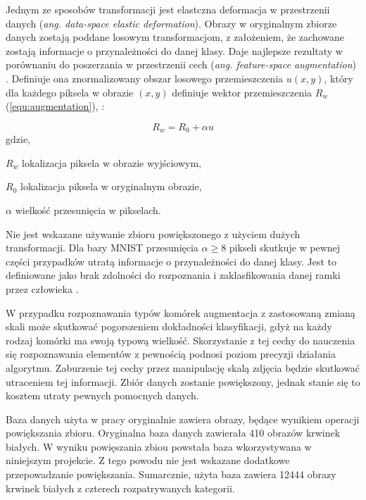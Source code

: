 {\parindent0pt %
Jednym ze sposobów transformacji jest elastczna deformacja w przestrzenii danych (\textit{ang. data-space elastic deformation}). Obrazy w oryginalnym zbiorze danych zostają poddane losowym transformacjom, z założeniem, że zachowane zostają informacje o przynależności do danej klasy. Daje najlepsze rezultaty w porównaniu do poszerzania w przestrzenii cech (\textit{ang. feature-space augmentation}) \cite{Wong2016UnderstandingDA}. Definiuje ona znormalizowany obszar losowego przemieszczenia \(u(x,y)\), który dla każdego piksela w obrazie \((x,y)\) definiuje wektor przemieszczenia \(R_w\) (\ref{equ:augmentation}), \cite{Wong2016UnderstandingDA}:

\begin{equation}
R_w = R_0 + \alpha u
\label{equ:augmentation}
\end{equation}
gdzie,
\begin{eqwhere}[2cm]
	\item[$R_w$] lokalizacja piksela w obrazie wyjściowym,
	\item[$R_0$] lokalizacja piksela w oryginalnym obrazie,
	\item[$\alpha$] wielkość przesunięcia w pikselach.
\end{eqwhere}

Nie jest wskazane używanie zbioru powiększonego z użyciem dużych transformacji. Dla bazy MNIST przesunięcia \( \alpha \geq 8 \)  pikseli skutkuje w pewnej części przypadków utratą informacje o przynależności do danej klasy. Jest to definiowane jako brak zdolności do rozpoznania i zaklasfikowania danej ramki przez człowieka \cite{Wong2016UnderstandingDA}.

W przypadku rozpoznawania typów komórek augmentacja z zastosowaną zmianą skali może skutkować pogorszeniem dokładności klasyfikacji, gdyż na każdy rodzaj komórki ma swoją typową wielkość. Skorzystanie z tej cechy do nauczenia się rozpoznawania elementów z pewnością podnosi poziom precyzji działania algorytmu. Zaburzenie tej cechy przez manipulację skalą zdjęcia będzie skutkować utraceniem tej informacji. Zbiór danych zostanie powiększony, jednak stanie się to kosztem utraty pewnych pomocnych danych.

Baza danych użyta w pracy oryginalnie zawiera obrazy, będące wynikiem operacji powiększania zbioru. Oryginalna baza danych zawierała 410 obrazów krwinek białych. W wyniku powięszania zbiou powstała baza wkorzystywana w niniejszym projekcie. Z tego powodu nie jest wskazane dodatkowe przepowadzanie powiększania. Sumarcznie, użyta baza zawiera 12444 obrazy krwinek białych z czterech rozpatrywanych kategorii.
}

